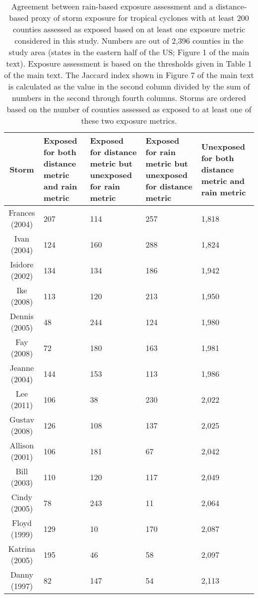 \begin{table}[ht]
\centering
\caption{Agreement between rain-based exposure assessment and a distance-based
         proxy of storm exposure for tropical cyclones with at least 200 counties assessed 
         as exposed based on at least one exposure metric considered in this study. Numbers 
         are out of 2,396 counties in the study area (states in the eastern half of the US; 
         Figure 1 of the main text). Exposure assessment is based on the thresholds given in 
         Table 1 of the main text. The Jaccard index shown in Figure 7 of the main text is 
         calculated as the value in the second column divided by the sum of numbers in the 
         second through fourth columns.  Storms are ordered based on the number of counties 
         assessed as exposed to at least one of these two exposure metrics.} 
\label{tab:misclassrain}
\begin{tabular}{cP{3cm}P{3cm}P{3cm}P{3cm}}
  \toprule
Storm & Exposed for both distance metric and rain metric & Exposed for distance metric but unexposed for rain metric & Exposed for rain metric but unexposed for distance metric & Unexposed for both distance metric and rain metric \\ 
  \midrule
Frances (2004) & 207 & 114 & 257 & 1,818 \\ 
  Ivan (2004) & 124 & 160 & 288 & 1,824 \\ 
  Isidore (2002) & 134 & 134 & 186 & 1,942 \\ 
  Ike (2008) & 113 & 120 & 213 & 1,950 \\ 
  Dennis (2005) & 48 & 244 & 124 & 1,980 \\ 
  Fay (2008) & 72 & 180 & 163 & 1,981 \\ 
  Jeanne (2004) & 144 & 153 & 113 & 1,986 \\ 
  Lee (2011) & 106 & 38 & 230 & 2,022 \\ 
  Gustav (2008) & 126 & 108 & 137 & 2,025 \\ 
  Allison (2001) & 106 & 181 & 67 & 2,042 \\ 
  Bill (2003) & 110 & 120 & 117 & 2,049 \\ 
  Cindy (2005) & 78 & 243 & 11 & 2,064 \\ 
  Floyd (1999) & 129 & 10 & 170 & 2,087 \\ 
  Katrina (2005) & 195 & 46 & 58 & 2,097 \\ 
  Danny (1997) & 82 & 147 & 54 & 2,113 \\ 

\end{tabular}
\end{table}
